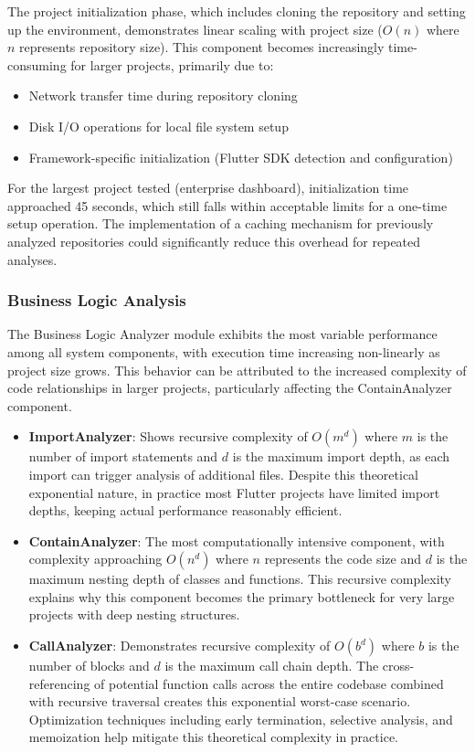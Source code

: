 The project initialization phase, which includes cloning the repository and setting up the environment, demonstrates linear scaling with project size ($O(n)$ where $n$ represents repository size). This component becomes increasingly time-consuming for larger projects, primarily due to:

\begin{itemize}
    \item Network transfer time during repository cloning
    \item Disk I/O operations for local file system setup
    \item Framework-specific initialization (Flutter SDK detection and configuration)
\end{itemize}

For the largest project tested (enterprise dashboard), initialization time approached 45 seconds, which still falls within acceptable limits for a one-time setup operation. The implementation of a caching mechanism for previously analyzed repositories could significantly reduce this overhead for repeated analyses.

\subsubsection{Business Logic Analysis}

The Business Logic Analyzer module exhibits the most variable performance among all system components, with execution time increasing non-linearly as project size grows. This behavior can be attributed to the increased complexity of code relationships in larger projects, particularly affecting the ContainAnalyzer component.

\begin{itemize}
    \item \textbf{ImportAnalyzer}: Shows recursive complexity of $O(m^d)$ where $m$ is the number of import statements and $d$ is the maximum import depth, as each import can trigger analysis of additional files. Despite this theoretical exponential nature, in practice most Flutter projects have limited import depths, keeping actual performance reasonably efficient.
    
    \item \textbf{ContainAnalyzer}: The most computationally intensive component, with complexity approaching $O(n^d)$ where $n$ represents the code size and $d$ is the maximum nesting depth of classes and functions. This recursive complexity explains why this component becomes the primary bottleneck for very large projects with deep nesting structures.
    
    \item \textbf{CallAnalyzer}: Demonstrates recursive complexity of $O(b^d)$ where $b$ is the number of blocks and $d$ is the maximum call chain depth. The cross-referencing of potential function calls across the entire codebase combined with recursive traversal creates this exponential worst-case scenario. Optimization techniques including early termination, selective analysis, and memoization help mitigate this theoretical complexity in practice.
\end{itemize}

